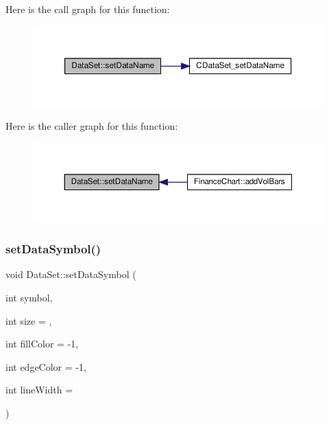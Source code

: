 Here is the call graph for this function\+:
\nopagebreak
\begin{figure}[H]
\begin{center}
\leavevmode
\includegraphics[width=350pt]{class_data_set_a9a6419f8f676068219d9b55c45eb19c2_cgraph}
\end{center}
\end{figure}
Here is the caller graph for this function\+:
\nopagebreak
\begin{figure}[H]
\begin{center}
\leavevmode
\includegraphics[width=350pt]{class_data_set_a9a6419f8f676068219d9b55c45eb19c2_icgraph}
\end{center}
\end{figure}
\mbox{\label{class_data_set_aa9edb7443935eb5f07f7d70b7f65656d}} 
\subsubsection{\texorpdfstring{set\+Data\+Symbol()}{setDataSymbol()}\hspace{0.1cm}{\footnotesize\ttfamily [1/4]}}
{\footnotesize\ttfamily void Data\+Set\+::set\+Data\+Symbol (\begin{DoxyParamCaption}\item[{int}]{symbol,  }\item[{int}]{size = {},  }\item[{int}]{fill\+Color = {\ttfamily -\/1},  }\item[{int}]{edge\+Color = {\ttfamily -\/1},  }\item[{int}]{line\+Width = {} }\end{DoxyParamCaption})\hspace{0.3cm}{\ttfamily [inline]}}



